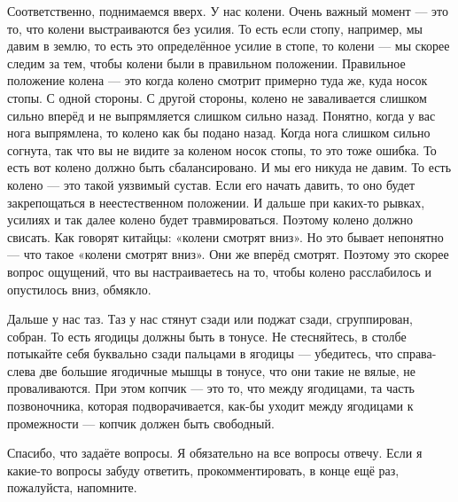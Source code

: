 Соответственно, 
поднимаемся вверх. У нас колени. Очень важный момент --- это то, что колени выстраиваются без 
усилия. То есть если стопу, например, мы давим в землю, то есть это определённое усилие в 
стопе, то колени --- мы скорее следим за тем, чтобы колени были в правильном положении. 
Правильное положение колена --- это когда колено смотрит примерно туда же, куда носок стопы. С 
одной стороны. С другой стороны, колено не заваливается слишком сильно вперёд и не выпрямляется 
слишком сильно назад. Понятно, когда у вас нога выпрямлена, то колено как бы подано назад. 
Когда нога слишком сильно согнута, так что вы не видите за коленом носок стопы, то это тоже 
ошибка. То есть вот колено должно быть сбалансировано. И мы его никуда не давим. То есть 
колено --- это такой уязвимый сустав. Если его начать давить, то оно будет закрепощаться в 
неестественном положении. И дальше при каких-то рывках, усилиях и так далее колено будет 
травмироваться. Поэтому колено должно свисать. Как говорят китайцы: «колени смотрят вниз». 
Но это бывает непонятно --- что такое «колени смотрят вниз». Они же вперёд смотрят. Поэтому это 
скорее вопрос ощущений, что вы настраиваетесь на то, чтобы колено расслабилось и опустилось 
вниз, обмякло.

Дальше у нас таз. Таз у нас стянут сзади или поджат сзади, сгруппирован, собран. 
То есть ягодицы должны быть в тонусе. Не стесняйтесь, в столбе потыкайте себя буквально 
сзади пальцами в ягодицы --- убедитесь, что справа-слева две большие ягодичные мышцы в тонусе,
что они такие не вялые, не проваливаются. При этом копчик --- это то, что между ягодицами, та
часть 
позвоночника, которая подворачивается, как-бы уходит между ягодицами к промежности ---
копчик должен быть свободный.

Спасибо, что задаёте вопросы. Я обязательно на все вопросы 
отвечу. Если я какие-то вопросы забуду ответить, прокомментировать, в конце ещё раз, 
пожалуйста, напомните.

